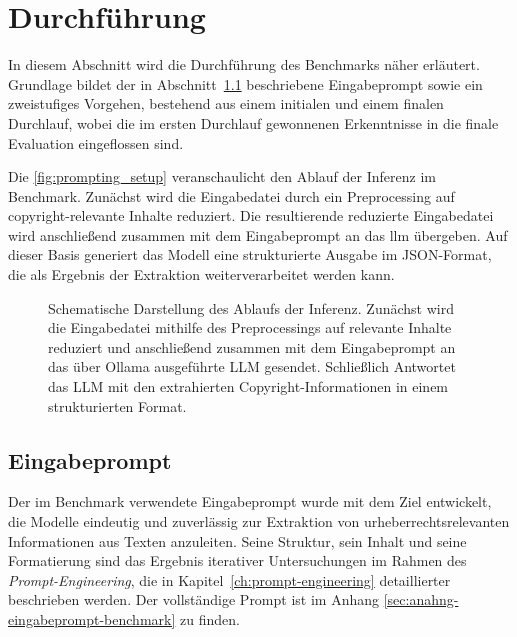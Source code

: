 
\section{Durchführung}\label{sec:durchfuhrung-benchmark}

In diesem Abschnitt wird die Durchführung des Benchmarks näher erläutert.
Grundlage bildet der in Abschnitt~\ref{subsec:eingabeprompt} beschriebene Eingabeprompt sowie ein zweistufiges Vorgehen, bestehend aus einem initialen und einem finalen Durchlauf, wobei die im ersten Durchlauf gewonnenen Erkenntnisse in die finale Evaluation eingeflossen sind.

Die \autoref{fig:prompting_setup} veranschaulicht den Ablauf der Inferenz im Benchmark.
Zunächst wird die Eingabedatei durch ein Preprocessing auf copyright-relevante Inhalte reduziert.
Die resultierende reduzierte Eingabedatei wird anschließend zusammen mit dem Eingabeprompt an das \gls{llm} übergeben.
Auf dieser Basis generiert das Modell eine strukturierte Ausgabe im JSON-Format, die als Ergebnis der Extraktion weiterverarbeitet werden kann.

\begin{figure}[ht]
    \centering
    \caption{Schematische Darstellung des Ablaufs der Inferenz. Zunächst wird die Eingabedatei mithilfe des Preprocessings auf relevante Inhalte reduziert und anschließend zusammen mit dem Eingabeprompt an das über Ollama ausgeführte LLM gesendet. Schließlich Antwortet das LLM mit den extrahierten Copyright-Informationen in einem strukturierten Format.}
    \label{fig:prompting_setup}
\end{figure}


\subsection{Eingabeprompt}\label{subsec:eingabeprompt}

Der im Benchmark verwendete Eingabeprompt wurde mit dem Ziel entwickelt, die Modelle eindeutig und zuverlässig zur Extraktion von urheberrechtsrelevanten Informationen aus Texten anzuleiten.
Seine Struktur, sein Inhalt und seine Formatierung sind das Ergebnis iterativer Untersuchungen im Rahmen des \textit{Prompt-Engineering}, die in Kapitel~\ref{ch:prompt-engineering} detaillierter beschrieben werden.
Der vollständige Prompt ist im Anhang \ref{sec:anahng-eingabeprompt-benchmark} zu finden.

